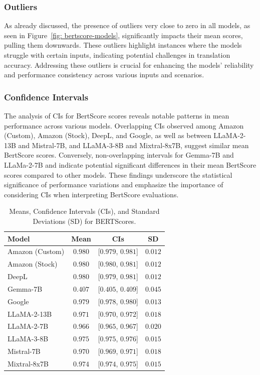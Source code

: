 \subsubsection{Outliers}

As already discussed, the presence of outliers very close to zero in all models, as seen in Figure~\ref{fig: bertscore-models}, significantly impacts their mean scores, pulling them downwards. These outliers highlight instances where the models struggle with certain inputs, indicating potential challenges in translation accuracy. Addressing these outliers is crucial for enhancing the models' reliability and performance consistency across various inputs and scenarios.


\subsubsection{Confidence Intervals}

The analysis of CIs for BertScore scores reveals notable patterns in mean performance across various models. Overlapping CIs observed among Amazon (Custom), Amazon (Stock), DeepL, and Google, as well as between LLaMA-2-13B and Mistral-7B, and LLaMA-3-8B and Mixtral-8x7B, suggest similar mean BertScore scores. Conversely, non-overlapping intervals for Gemma-7B and LLaMa-2-7B and indicate potential significant differences in their mean BertScore scores compared to other models. These findings underscore the statistical significance of performance variations and emphasize the importance of considering CIs when interpreting BertScore evaluations.

\begin{table}[htb]
\centering
\begin{tabular}{lccc}
\toprule
\textbf{Model} & \textbf{Mean} & \textbf{CIs} & \textbf{SD} \\
\midrule
Amazon (Custom) & $\mathbf{0.980}$ & [$0.979$, $0.981$] & $0.012$ \\
Amazon (Stock) & $\mathbf{0.980}$ & [$0.980$, $0.981$] & $0.012$ \\
DeepL & $\mathbf{0.980}$ & [$0.979$, $0.981$] & $0.012$ \\
Gemma-7B & $0.407$ & [$0.405$, $0.409$] & $0.045$ \\
Google & $0.979$ & [$0.978$, $0.980$] & $0.013$ \\
LLaMA-2-13B & $0.971$ & [$0.970$, $0.972$] & $0.018$ \\
LLaMA-2-7B & $0.966$ & [$0.965$, $0.967$] & $0.020$ \\
LLaMA-3-8B & $0.975$ & [$0.975$, $0.976$] & $0.015$ \\
Mistral-7B & $0.970$ & [$0.969$, $0.971$] & $0.018$ \\
Mixtral-8x7B & $0.974$ & [$0.974$, $0.975$] & $0.015$ \\
\bottomrule
\end{tabular}
\caption{Means, Confidence Intervals (CIs), and Standard Deviations (SD) for BERTScores.}
\label{tab:mean_ci_scores_bert}
\end{table}


